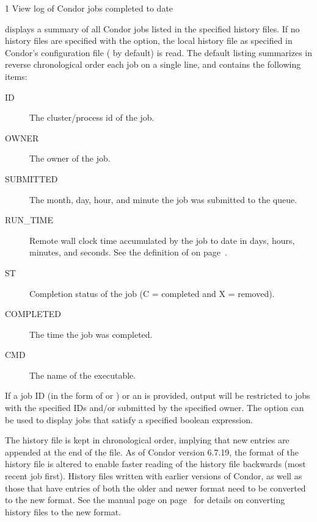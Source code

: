 \begin{ManPage}{\label{man-condor-history}}{1}
{View log of Condor jobs completed to date}
\Synopsis
{}


\Description
{} displays a summary of all Condor jobs listed in the
specified history files.
If no history files are specified with the  option, 
the local history file as specified in Condor's configuration file
( by default) is read.  
The default listing summarizes in reverse chronological order
each job on a single line, and  contains the following items:


\begin{description}
\item[ID] The cluster/process id of the job. 
\item[OWNER] The owner of the job. 
\item[SUBMITTED] The month, day, hour, and minute the job was submitted to the queue. 
\item[RUN\_TIME] Remote wall clock time accumulated by the job to date in days, hours, minutes, and seconds.  See the definition of
 on page~\pageref{RemoteWallClockTime}.
\item[ST] Completion status of the job (C = completed and X = removed).
\item[COMPLETED] The time the job was completed.
\item[CMD] The name of the executable. 
\end{description}

If a job ID (in the form of  or ) or an
 is provided, output will be restricted to jobs with the
specified IDs and/or submitted by the specified owner.  
The  option can be used to display jobs that satisfy a
specified boolean expression.

The history file is kept in chronological order,
implying that new entries are appended at the end of the
file.
As of Condor version 6.7.19,
the format of the history file is altered to enable faster
reading of the history file backwards (most recent job first).
History files written with earlier versions of Condor,
as well as those that have entries of both
the older and newer format
need to be converted to the new format.
See the  manual page 
on page~\pageref{man-condor-convert-history}
for details on converting history files to the new format.


\end{ManPage}

